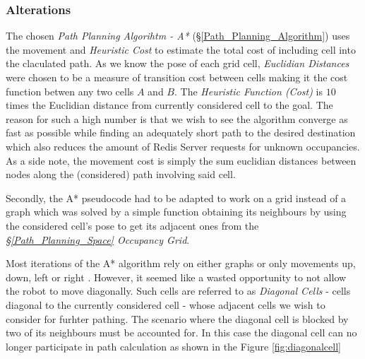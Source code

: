 \documentclass[11pt, a4paper]{article}
\begin{document}
\subsubsection{Alterations}
\label{Path_Planning_Algorihtm_Alterations}

The chosen \textit{Path Planning Algorihtm - A*} (\S\ref{Path_Planning_Algorithm}) uses the movement 
and \textit{Heuristic Cost} to estimate the total cost of  including cell into the claculated path. 
As we know the pose of each grid cell, \textit{Euclidian Distances} were chosen to be a 
measure of transition cost between cells making it the cost function betwen any two cells $A$ and $B$. 
The \textit{Heuristic Function (Cost)} is $10$ times the Euclidian distance from currently considered 
cell to the goal. The reason for such a high number is that we wish to see the algorithm converge as 
fast as possible while finding an adequately short path to the desired destination which also reduces 
the amount of Redis Server requests for unknown occupancies. As a side note, the movement cost is 
simply the sum euclidian distances between nodes along the (considered) path involving said cell.

Secondly, the A* pseudocode had to be adapted to work on a grid instead of a graph which was solved 
by a simple function obtaining its neighbours by using the considered cell's pose to get its adjacent 
ones from the \textit{\S\ref{Path_Planning_Space} Occupancy Grid}.

Most iterations of the A* algorithm rely on either graphs \cite{path_astar_grid_no_grid}  or 
only movements up, down, left or right \cite{path_astar_grid_no_diagonals}. However, it seemed like a 
wasted opportunity to not allow the robot to move diagonally. Such cells are referred to as  
\textit{Diagonal Cells} - cells diagonal to the currently considered cell - whose adjacent cells 
we wish to consider for furhter pathing. The scenario where the diagonal cell is blocked by two of 
its neighbours must be accounted for. In this case the diagonal cell can no longer participate in 
path calculation as shown in the Figure \ref{fig:diagonalcell}
\end{document}
